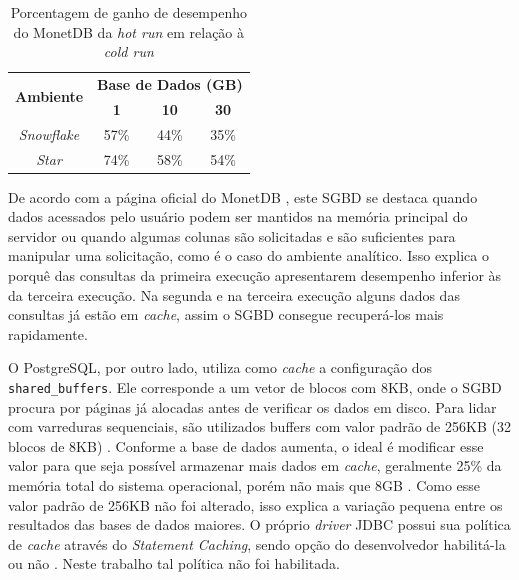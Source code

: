 \begin{table}[htpb]
        \centering
        \caption{Porcentagem de ganho de desempenho do MonetDB da \textit{hot run} em relação à \textit{cold run}}
        \label{tab:ganho_monet_cold_hot}
        \begin{tabular}{|c|c|c|c|}
        \hline
        \multirow{2}{*}{\textbf{Ambiente}} & \multicolumn{3}{c|}{\textbf{Base de Dados (GB)}} \\ \cline{2-4} 
        & \textbf{1}     & \textbf{10}    & \textbf{30}    \\ \hline
        \textit{Snowflake}                 & 57\%           & 44\%           & 35\%           \\ \hline
        \textit{Star}                      & 74\%           & 58\%           & 54\%           \\ \hline
        \end{tabular}
\end{table}

De acordo com a página oficial do MonetDB \cite{monetdb2017c}, este SGBD se destaca quando dados acessados pelo usuário podem ser mantidos na memória principal do servidor ou quando algumas colunas são solicitadas e são suficientes para manipular uma solicitação, como é o caso do ambiente analítico. Isso explica o porquê das consultas da primeira execução apresentarem desempenho inferior às da terceira execução. Na segunda e na terceira execução alguns dados das consultas já estão em \textit{cache}, assim o SGBD consegue recuperá-los mais rapidamente.

O PostgreSQL, por outro lado, utiliza como \textit{cache} a configuração dos \texttt{shared\_buffers}. Ele corresponde a um vetor de blocos com 8KB, onde o SGBD procura por páginas já alocadas antes de verificar os dados em disco. Para lidar com varreduras sequenciais, são utilizados buffers com valor padrão de 256KB (32 blocos de 8KB) \cite{psqlcache2018r}. Conforme a base de dados aumenta, o ideal é modificar esse valor para que seja possível armazenar mais dados em \textit{cache}, geralmente 25\% da memória total do sistema operacional, porém não mais que 8GB \cite{psql2018conf}. Como esse valor padrão de 256KB não foi alterado, isso explica a variação pequena entre os resultados das bases de dados maiores. O próprio \textit{driver} JDBC possui sua política de \textit{cache} através do \textit{Statement Caching}, sendo opção do desenvolvedor habilitá-la ou não \cite{jdbc2018cache}. Neste trabalho tal política não foi habilitada.

